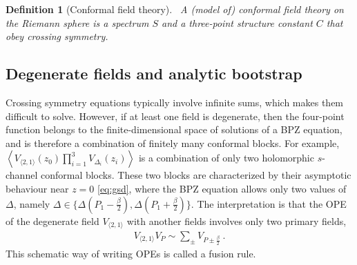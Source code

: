 \documentclass[12pt, a4paper]{article}
\theoremstyle{break}
\newtheorem{defn}[exo]{Definition}
\begin{document}
\begin{defn}[Conformal field theory]
~\label{def:cft}
A (model of) conformal field theory on the Riemann sphere is a spectrum $S$ and a three-point structure constant $C$ that obey crossing symmetry.
\end{defn}


\subsection{Degenerate fields and analytic bootstrap}\label{sec:dffp}

Crossing symmetry equations typically involve infinite sums, which makes them difficult to solve.
However, if at least one field is degenerate, then the four-point function belongs to the finite-dimensional space of solutions of a BPZ equation, and is therefore a combination of finitely many conformal blocks. 
For example,
$\left< V_{\langle 2, 1 \rangle}(z_0) \prod_{i=1}^3 V_{\Delta_i}(z_i) \right>$ is a combination of only two holomorphic $s$-channel conformal blocks.
These two blocks are characterized by their asymptotic behaviour near $z=0$ \eqref{eq:gsd}, where the BPZ equation allows only two values of $\Delta$, namely $\Delta\in\{\Delta(P_1-\frac{\beta}{2}),\Delta(P_1+\frac{\beta}{2})\}$.
The interpretation is that the OPE of the degenerate field $V_{\langle 2,1\rangle}$ with another fields involves only two primary fields,
\begin{align}
 V_{\langle 2,1\rangle} V_P \sim \sum_\pm V_{P\pm \frac{\beta}{2}} \ .
\end{align}
This schematic way of writing OPEs is called a fusion rule.
\end{document}
